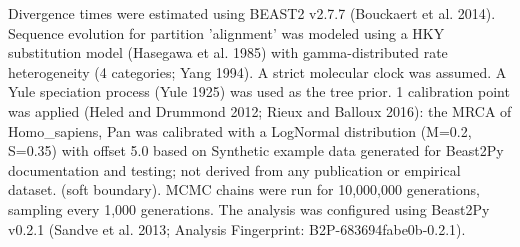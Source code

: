 Divergence times were estimated using BEAST2 v2.7.7 (Bouckaert et al. 2014). Sequence evolution for partition 'alignment' was modeled using a HKY substitution model (Hasegawa et al. 1985) with gamma-distributed rate heterogeneity (4 categories; Yang 1994). A strict molecular clock was assumed. A Yule speciation process (Yule 1925) was used as the tree prior. 1 calibration point was applied (Heled and Drummond 2012; Rieux and Balloux 2016): the MRCA of Homo_sapiens, Pan was calibrated with a LogNormal distribution (M=0.2, S=0.35) with offset 5.0 based on Synthetic example data generated for Beast2Py documentation and testing; not derived from any publication or empirical dataset. (soft boundary). MCMC chains were run for 10,000,000 generations, sampling every 1,000 generations. The analysis was configured using Beast2Py v0.2.1 (Sandve et al. 2013; Analysis Fingerprint: B2P-683694fabe0b-0.2.1).

